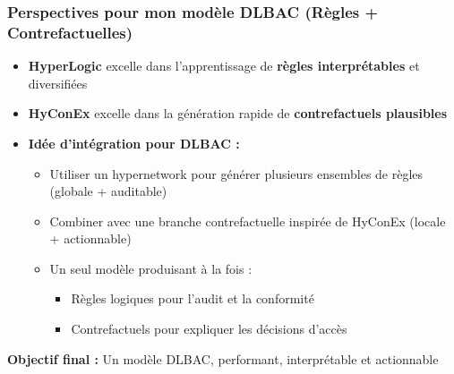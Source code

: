 \documentclass{beamer}
\begin{document}
\begin{frame}
\frametitle{Perspectives pour mon modèle DLBAC (Règles + Contrefactuelles)}

\begin{itemize}
    \item \textbf{HyperLogic} excelle dans l'apprentissage de \textbf{règles interprétables} et diversifiées
    \item \textbf{HyConEx} excelle dans la génération rapide de \textbf{contrefactuels plausibles}
    \item \textbf{Idée d'intégration pour DLBAC :}
    \begin{itemize}
        \item Utiliser un hypernetwork pour générer plusieurs ensembles de règles (globale + auditable)
        \item Combiner avec une branche contrefactuelle inspirée de HyConEx (locale + actionnable)
        \item Un seul modèle produisant à la fois :
        \begin{itemize}
            \item Règles logiques pour l’audit et la conformité
            \item Contrefactuels pour expliquer les décisions d’accès
        \end{itemize}
    \end{itemize}
\end{itemize}

\begin{center}
\textbf{Objectif final :} Un modèle DLBAC, performant, interprétable et actionnable
\end{center}

\end{frame}

\end{document}
